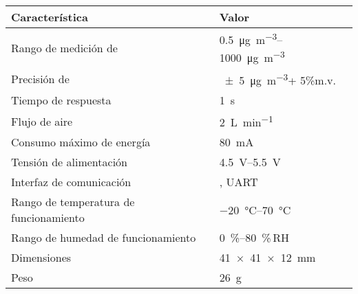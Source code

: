 
\begin{tabular}{ll}
	\toprule
	\textbf{Característica} & \textbf{Valor} \\ 
	\midrule
	Rango de medición de \MPF & \SIrange{0.5}{1000}{\micro\gram\per\cubic\meter} \\ 
	Precisión de \MPF & \SI{\pm5}{\micro\gram\per\cubic\meter}+ 5\%m.v.\\ 
	Tiempo de respuesta & \SI{1}{\second} \\ 
	Flujo de aire & \SI{2}{\liter\per\minute} \\ 
	Consumo máximo de energía & \SI{80}{\milli\ampere} \\ 
	Tensión de alimentación & \SIrange{4.5}{5.5}{\volt} \\ 
	Interfaz de comunicación & \IIC, UART \\ 
	Rango de temperatura de funcionamiento & \SIrange{-20}{70}{\celsius} \\ 
	Rango de humedad de funcionamiento & \SIrange{0}{80}{\percent}\,RH \\ 
	Dimensiones & \SI{41x41x12}{\milli\meter} \\ 
	Peso & \SI{26}{\gram} \\ 
	\bottomrule
\end{tabular}
